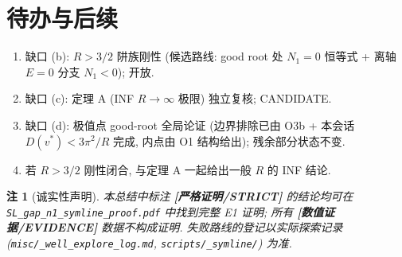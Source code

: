 \documentclass[UTF8]{ctexart}
\newtheorem{remark}[theorem]{注}
\newcommand{\STRICT}{\textbf{[严格证明/STRICT]}}
\newcommand{\EVID}{\textbf{[数值证据/EVIDENCE]}}
\begin{document}
\section{待办与后续}

\begin{enumerate}
	\item 缺口 (b): $R>3/2$ 阱族刚性 (候选路线: good root 处 $N_1=0$ 恒等式 +
		离轴 $E=0$ 分支 $N_1<0$); 开放.
	\item 缺口 (c): 定理 A (INF $R\to\infty$ 极限) 独立复核; CANDIDATE.
	\item 缺口 (d): 极值点 good-root 全局论证 (边界排除已由 O3b + 本会话
		$D(v^*)<3\pi^2/R$ 完成, 内点由 O1 结构给出); 残余部分状态不变.
	\item 若 $R>3/2$ 刚性闭合, 与定理 A 一起给出一般 $R$ 的 INF 结论.
\end{enumerate}

\begin{remark}[诚实性声明]
本总结中标注 \STRICT{} 的结论均可在 \texttt{SL\_gap\_n1\_symline\_proof.pdf}
中找到完整 E1 证明; 所有 \EVID{} 数据不构成证明. 失败路线的登记以实际探索记录
(\texttt{misc/\_well\_explore\_log.md}, \texttt{scripts/\_symline/}) 为准.
\end{remark}
\end{document}
